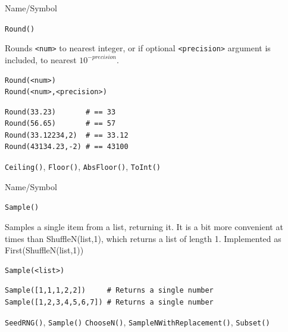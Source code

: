 \begin{desc}{Name/Symbol}
\item[Name/Symbol] 	\verb+Round()+

\item[Description] 	Rounds \verb+<num>+ to nearest integer, or if optional \verb+<precision>+ argument is included, to nearest $10^{-precision}$.

\item[Usage]        	
\begin{verbatim}
Round(<num>)
Round(<num>,<precision>)
\end{verbatim}

\item[Example]
\begin{verbatim}
Round(33.23)       # == 33
Round(56.65)       # == 57
Round(33.12234,2)  # == 33.12
Round(43134.23,-2) # == 43100
\end{verbatim}

\item[See Also]     	\verb+Ceiling()+, \verb+Floor()+, \verb+AbsFloor()+, \verb+ToInt()+
\end{desc}

\vfill
\newpage
{}
\vfill


\begin{desc}{Name/Symbol}
\item[Name/Symbol]  	\verb+Sample()+

\item[Description] Samples a single item from a list, returning it.
  It is a bit more convenient at times than ShuffleN(list,1), which
  returns a list of length 1.  Implemented as First(ShuffleN(list,1))


\item[Usage]       	
\begin{verbatim}
Sample(<list>)
\end{verbatim}

\item[Example]   	
\begin{verbatim}
Sample([1,1,1,2,2])     # Returns a single number
Sample([1,2,3,4,5,6,7]) # Returns a single number
\end{verbatim}

\item[See Also]    	\verb+SeedRNG()+, \verb+Sample()+ \verb+ChooseN()+, \verb+SampleNWithReplacement()+, \verb+Subset()+
\end{desc}

